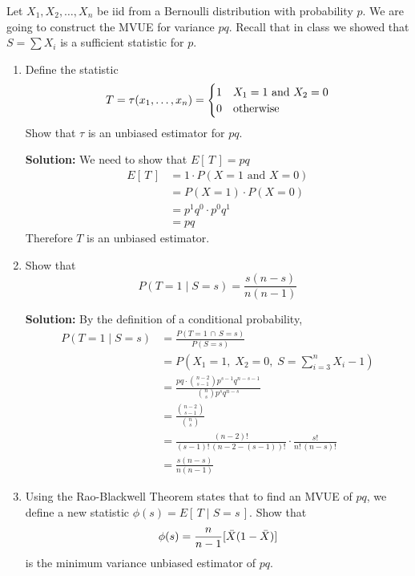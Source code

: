 Let $X_1, X_2, \dots, X_n$ be iid from a Bernoulli distribution with probability $p$. We are going to construct the MVUE for variance $pq$. Recall that in class we showed that $S = \sum X_i$ is a sufficient statistic for $p$.
\begin{enumerate}[label=({\alph*})]
    \item Define the statistic
    $$T = \tau({x}_1, \dots, {x}_n) = \begin{cases}1 & X_1 = 1 \text{ and } X_2 = 0\\ 0 & \text{otherwise} \end{cases}$$
    Show that $\tau$ is an unbiased estimator for $pq$.
    
    \nl \textbf{Solution: } We need to show that $E[\,T\,] = pq$
    \begin{align*}
        E[\,T\,] &= 1 \cdot P(X = 1 \text{ and } X=0)\\
        &= P(X=1)\cdot P(X=0)\\
        &= p^1 q^0 \cdot p^0 q^1 \\&= pq
    \end{align*}
    Therefore $T$ is an unbiased estimator.

    \vspace{1in}
    \item Show that $$P(T = 1 \mid S = s) = \frac{s(n-s)}{n(n-1)}$$
    
    \nnl \textbf{Solution: } By the definition of a conditional probability,
    \begin{align*}
        P(T = 1 \mid S = s) &= \frac{P(T = 1 \,\cap\, S = s)}{P(S=s)}\\&= P(X_1 = 1,\; X_2 = 0, \;S = \sum_{i=3}^n X_i - 1)\\&= \frac{pq \cdot \binom{n-2}{s-1}p^{s-1}q^{n-s-1}}{\binom{n}{s}p^sq^{n-s}}\\ &= \frac{\binom{n-2}{s-1}}{\binom{n}{s}}\\ &=
        \frac{(n-2)!}{(s-1)! \, (n-2-(s-1))!} \cdot \frac{s!}{n!\,(n-s)!}
        \\&= \frac{s(n-s)}{n(n-1)}
    \end{align*}

    \newpage
    \item Using the Rao-Blackwell Theorem states that to find an MVUE of $pq$, we define a new statistic $\phi(s) = E[\,T \mid S = s\,]$. Show that
    $$\phi(s) = \frac{n}{n-1}[\bar{X}(1-\bar{X})]$$
    is the minimum variance unbiased estimator of $pq$.
    

\end{enumerate}

